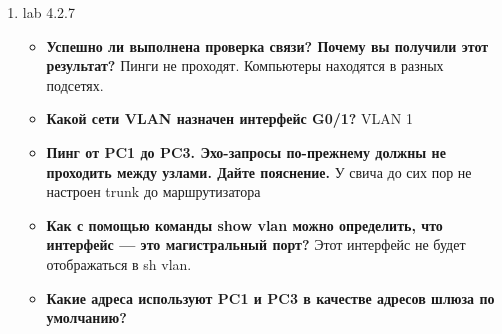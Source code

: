 \documentclass[a4paper,14pt]{extarticle}
\begin{document}
\begin{enumerate}
\begin{itemize}
\begin{lstlisting}
hostname SWB
!
spanning-tree mode pvst
spanning-tree extend system-id
!
interface FastEthernet0/1
switchport access vlan 10
switchport mode access
!
interface FastEthernet0/2
switchport access vlan 20
switchport mode access
!
interface FastEthernet0/3
switchport access vlan 30
switchport mode access
... 
interface FastEthernet0/24
!
interface GigabitEthernet0/1
switchport trunk native vlan 100
switchport mode trunk
switchport nonegotiate
!
interface GigabitEthernet0/2
!
interface Vlan1
no ip address
shutdown
!
interface Vlan99
ip address 192.168.99.253 255.255.255.0
!
line con 0
!
line vty 0 4
login
line vty 5 15
login
!
end
            \end{lstlisting}
        \item SWC
            \begin{lstlisting}
hostname SWC
!
spanning-tree mode pvst
spanning-tree extend system-id
!
interface FastEthernet0/1
switchport access vlan 10
switchport mode access
!
interface FastEthernet0/2
switchport access vlan 20
switchport mode access
!
interface FastEthernet0/3
switchport access vlan 30
switchport mode access
!
interface FastEthernet0/4
switchport access vlan 10
switchport mode access
switchport voice vlan 40
...
interface FastEthernet0/24
!
interface GigabitEthernet0/1
!
interface GigabitEthernet0/2
switchport trunk native vlan 100
!
interface Vlan1
no ip address
shutdown
!
interface Vlan99
ip address 192.168.99.254 255.255.255.0
!
line con 0
!
line vty 0 4
login
line vty 5 15
login
!
end
            \end{lstlisting}
        \end{itemize}
        \item lab 4.2.7
        \begin{itemize}
            \item \textbf{Успешно ли выполнена проверка связи? Почему вы получили этот результат?}
                Пинги не проходят. Компьютеры находятся в разных подсетях.
            \item \textbf{Какой сети VLAN назначен интерфейс G0/1?}
                VLAN 1
            \item \textbf{Пинг от PC1 до PC3. Эхо-запросы по-прежнему должны не проходить между узлами. Дайте пояснение.}
                У свича до сих пор не настроен trunk до маршрутизатора
            \item \textbf{Как с помощью команды show vlan можно определить, что интерфейс — это магистральный порт?}
                Этот интерфейс не будет отображаться в sh vlan.
             \item \textbf{Какие адреса используют PC1 и PC3 в качестве адресов шлюза по умолчанию?}

\end{itemize}
\end{enumerate}
\end{document}
